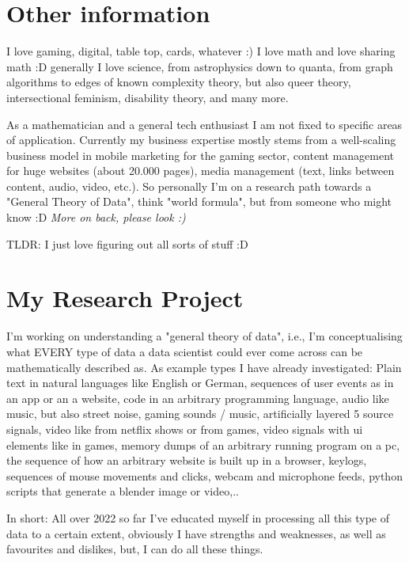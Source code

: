 \documentclass[a4paper]{twentysecondcv} %
\begin{document}

\section{Other information}
I love gaming, digital, table top, cards, whatever :) 
I love math and love sharing math :D generally I love science, from astrophysics down to quanta, 
from graph algorithms to edges of known complexity theory, but also queer theory,
intersectional feminism, disability theory, and many more.

As a mathematician and a general tech enthusiast I am not fixed to specific areas of application.
Currently my business expertise mostly stems from a well-scaling business model in mobile marketing for
the gaming sector, content management for huge websites (about 20.000 pages), media management (text, links between content, audio, video, etc.). So personally I'm on a research path towards a "General Theory of Data", think "world formula", but from someone who might know :D
{\it {More on back, please look :) }}

TLDR: I just love figuring out all sorts of stuff :D

\newpage 
\thispagestyle{empty}
\section{My Research Project}
I'm working on understanding a "general theory of data", i.e., I'm conceptualising what EVERY type of 
data a data scientist could ever come across can be mathematically described as. As example types I have already investigated:
Plain text in natural languages like English or German, sequences of user events as in an app or an a website, code in an arbitrary
programming language, audio like music, but also street noise, gaming sounds / music, artificially layered 5 source signals, video
like from netflix shows or from games, video signals with ui elements like in games, memory dumps of an arbitrary running program 
on a pc, the sequence of how an arbitrary website is built up in a browser, keylogs, sequences of mouse movements and clicks, webcam and
microphone feeds, python scripts that generate a blender image or video,..

In short: All over 2022 so far I've educated myself in processing all this type of data to a certain extent, obviously I 
have strengths and weaknesses, as well as favourites and dislikes, but, I can do all these things.
\end{document}
